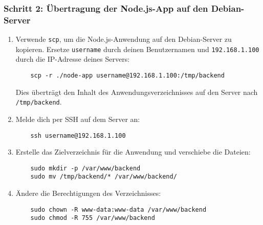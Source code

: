 \documentclass[a4paper,12pt]{article}
\begin{document}
\subsubsection{Schritt 2: Übertragung der Node.js-App auf den Debian-Server}
\begin{enumerate}
    \item Verwende \texttt{scp}, um die Node.js-Anwendung auf den Debian-Server zu kopieren. Ersetze \texttt{username} durch deinen Benutzernamen und \texttt{192.168.1.100} durch die IP-Adresse deines Servers:
    
    \begin{lstlisting}
    scp -r ./node-app username@192.168.1.100:/tmp/backend
    \end{lstlisting}
    
    Dies überträgt den Inhalt des Anwendungsverzeichnisses auf den Server nach \texttt{/tmp/backend}.
    
    \item Melde dich per SSH auf dem Server an:
    
    \begin{lstlisting}
    ssh username@192.168.1.100
    \end{lstlisting}
    
    \item Erstelle das Zielverzeichnis für die Anwendung und verschiebe die Dateien:
    
    \begin{lstlisting}
    sudo mkdir -p /var/www/backend
    sudo mv /tmp/backend/* /var/www/backend/
    \end{lstlisting}
    
    \item Ändere die Berechtigungen des Verzeichnisses:
    
    \begin{lstlisting}
    sudo chown -R www-data:www-data /var/www/backend
    sudo chmod -R 755 /var/www/backend
    \end{lstlisting}
\end{enumerate}
\end{document}
